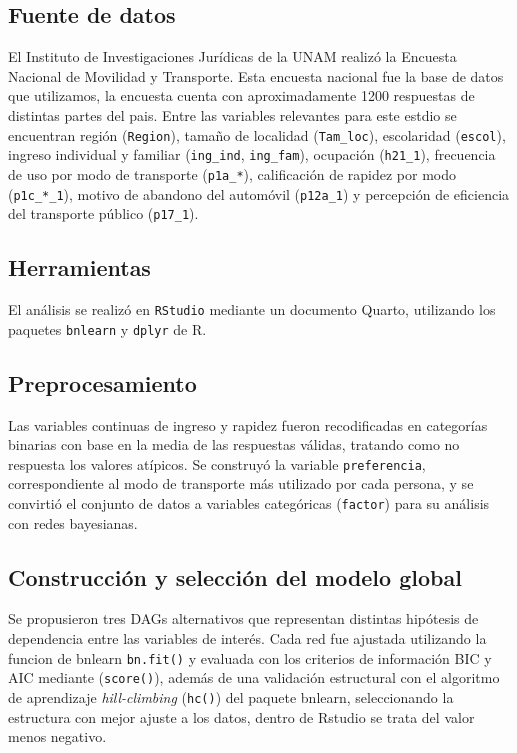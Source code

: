 \documentclass[
  letterpaper,
  DIV=11,
  numbers=noendperiod]{scrartcl}
\begin{document}
\subsection{Fuente de datos}
El Instituto de Investigaciones Jurídicas de la UNAM realizó la Encuesta Nacional de Movilidad y Transporte. Esta encuesta nacional fue la base de datos que utilizamos, la encuesta cuenta con aproximadamente 1200 respuestas de distintas partes del pais. Entre las variables relevantes para este estdio se  encuentran región (\texttt{Region}), tamaño de localidad (\texttt{Tam\_loc}), escolaridad (\texttt{escol}), ingreso individual y familiar (\texttt{ing\_ind}, \texttt{ing\_fam}), ocupación (\texttt{h21\_1}), frecuencia de uso por modo de transporte (\texttt{p1a\_*}), calificación de rapidez por modo (\texttt{p1c\_*\_1}), motivo de abandono del automóvil (\texttt{p12a\_1}) y percepción de eficiencia del transporte público (\texttt{p17\_1}).

\subsection{Herramientas}
El análisis se realizó en \texttt{RStudio} mediante un documento Quarto, utilizando los paquetes \texttt{bnlearn} y \texttt{dplyr} de R.

\subsection{Preprocesamiento}
Las variables continuas de ingreso y rapidez fueron recodificadas en categorías binarias con base en la media de las respuestas válidas, tratando como no respuesta los valores atípicos. Se construyó la variable \texttt{preferencia}, correspondiente al modo de transporte más utilizado por cada persona, y se convirtió el conjunto de datos a variables categóricas (\texttt{factor}) para su análisis con redes bayesianas.

\subsection{Construcción y selección del modelo global}
Se propusieron tres DAGs alternativos que representan distintas hipótesis de dependencia entre las variables de interés. Cada red fue ajustada utilizando la funcion de bnlearn \texttt{bn.fit()} y evaluada con los criterios de información BIC y AIC mediante (\texttt{score()}), además de una validación estructural con el algoritmo de aprendizaje \textit{hill-climbing} (\texttt{hc()}) del paquete bnlearn, seleccionando la estructura con mejor ajuste
a los datos, dentro de Rstudio se trata del valor menos negativo.
\end{document}
